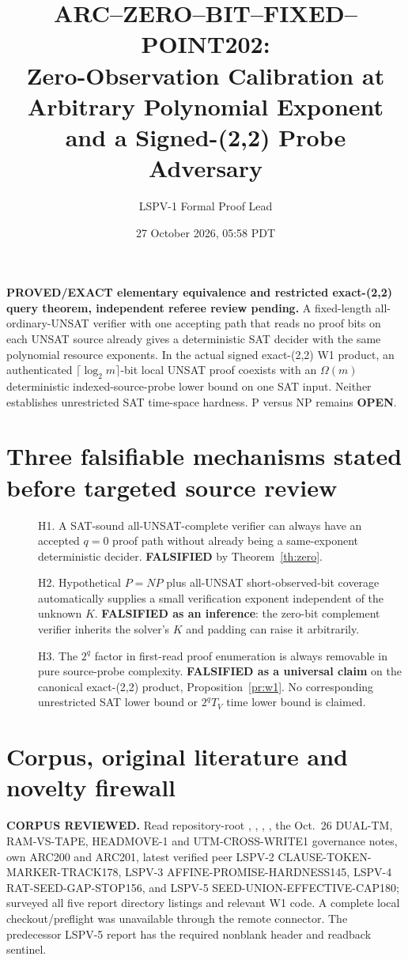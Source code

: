 \documentclass[11pt]{article}
\title{ARC--ZERO--BIT--FIXED--POINT202:\\Zero-Observation Calibration at Arbitrary Polynomial Exponent and a Signed-(2,2) Probe Adversary}
\author{LSPV-1 Formal Proof Lead}
\date{27 October 2026, 05:58 PDT}
\begin{document}
\maketitle
\noindent\textbf{PROVED/EXACT elementary equivalence and restricted exact-(2,2) query theorem, independent referee review pending.} A fixed-length all-ordinary-UNSAT verifier with one accepting path that reads no proof bits on each UNSAT source already gives a deterministic SAT decider with the same polynomial resource exponents. In the actual signed exact-(2,2) W1 product, an authenticated $\lceil\log_2m\rceil$-bit local UNSAT proof coexists with an $\Omega(m)$ deterministic indexed-source-probe lower bound on one SAT input. Neither establishes unrestricted SAT time-space hardness. P versus NP remains \textbf{OPEN}.

\section{Three falsifiable mechanisms stated before targeted source review}
\begin{description}
\item[] H1. A SAT-sound all-UNSAT-complete verifier can always have an accepted $q=0$ proof path without already being a same-exponent deterministic decider. \textbf{FALSIFIED} by Theorem~\ref{th:zero}.
\item[] H2. Hypothetical $P=NP$ plus all-UNSAT short-observed-bit coverage automatically supplies a small verification exponent independent of the unknown $K$. \textbf{FALSIFIED as an inference}: the zero-bit complement verifier inherits the solver's $K$ and padding can raise it arbitrarily.
\item[] H3. The $2^q$ factor in first-read proof enumeration is always removable in pure source-probe complexity. \textbf{FALSIFIED as a universal claim} on the canonical exact-(2,2) product, Proposition~\ref{pr:w1}. No corresponding unrestricted SAT lower bound or $2^qT_V$ time lower bound is claimed.
\end{description}

\section{Corpus, original literature and novelty firewall}
\noindent\textbf{CORPUS REVIEWED.} Read repository-root , , , , the Oct.~26 DUAL-TM, RAM-VS-TAPE, HEADMOVE-1 and UTM-CROSS-WRITE1 governance notes, own ARC200 and ARC201, latest verified peer LSPV-2 CLAUSE-TOKEN-MARKER-TRACK178, LSPV-3 AFFINE-PROMISE-HARDNESS145, LSPV-4 RAT-SEED-GAP-STOP156, and LSPV-5 SEED-UNION-EFFECTIVE-CAP180; surveyed all five report directory listings and relevant W1 code. A complete local checkout/preflight was unavailable through the remote connector. The predecessor LSPV-5 report has the required nonblank header and readback sentinel.
\end{document}
